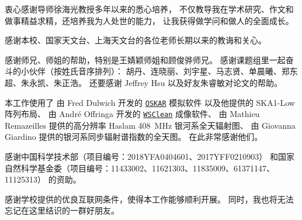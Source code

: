 
\begin{thanks}

衷心感谢导师徐海光教授多年以来的悉心培养，
不仅教导我在学术研究、作文和做事精益求精，还培养我为人处世的能力，
让我获得做学问和做人的全面成长。

感谢本校、国家天文台、上海天文台的各位老师长期以来的教诲和关心。

感谢师兄、师姐的帮助，特别是王婧颖师姐和顾俊骅师兄。
感谢课题组里一起奋斗的小伙伴（按姓氏音序排列）：
胡丹、连晓丽、刘宇星、马志贤、单晨曦、郑东超、朱永凯、朱正浩。
还要感谢 Jeffrey Hsu 以及好友朱睿敏对论文的帮助。

本工作使用了
由 Fred Dulwich 开发的
\href{https://github.com/OxfordSKA/OSKAR}{\texttt{OSKAR}} 模拟软件
以及他提供的 SKA1-Low 阵列布局、
由 André Offringa 开发的
\href{https://sourceforge.net/projects/wsclean/}{\texttt{WSClean}} 成像软件、
由 Mathieu Remazeilles 提供的高分辨率 Haslam \SI{408}{\MHz} 银河系全天辐射图、
由 Giovanna Giardino 提供的银河系同步辐射谱指数的全天图。
在此非常感谢他们。

感谢中国科学技术部（项目编号：2018YFA0404601、2017YFF0210903）
和国家自然科学基金委（项目编号：11433002、11621303、11835009、61371147、11125313）
的资助。

感谢学校提供的优良互联网条件，使得本工作能够顺利开展。
同时，我也将无法忘记在这里结识的一群好朋友。


\end{thanks}
